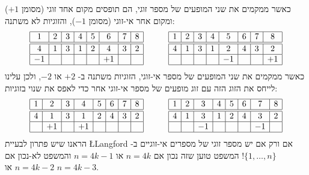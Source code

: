 כאשר ממקמים את שני המופעים של מספר זוגי, הם תופסים מקום אחד זוגי (מסומן 
$+1$)
ומקום אחר אי-זוגי (מסומן 
$-1$),
והזוגיות לא משתנה:
\[
\begin{array}{|c|c|c|c|c|c|c|c|}
\hline
1&2&3&4&5&6&7&8\\
\hline\hline
4&1&3&1&2&4&3&2\\\hline
-1&&&&&+1&&\\\hline
\end{array}
\hspace{3em}
\begin{array}{|c|c|c|c|c|c|c|c|}
\hline
1&2&3&4&5&6&7&8\\
\hline\hline
4&1&3&1&2&4&3&2\\\hline
&&&&-1&&&+1\\\hline
\end{array}
\]
כאשר ממקמים את שני המופעים של מספר אי-זוגי, הזוגיות משתנה ב-%
$+2$
או 
$-2$,
ולכן עלינו לייחס את הזוג הזה עם זוג מופעים של מספר אי-זוגי אחר כדי לאפס את שנוי בזוגיות:
\[
\begin{array}{|c|c|c|c|c|c|c|c|}
\hline
1&2&3&4&5&6&7&8\\
\hline\hline
4&1&3&1&2&4&3&2\\\hline
&+1&&+1&&&&\\\hline
\end{array}
\hspace{3em}
\begin{array}{|c|c|c|c|c|c|c|c|}
\hline
1&2&3&4&5&6&7&8\\
\hline\hline
4&1&3&1&2&4&3&2\\\hline
&&-1&&&&-1&\\\hline
\end{array}
\]
הראנו שיש פתרון לבעיית
\L{Langford}
אם ורק אם יש מספר זוגי של מספרים אי-זוגיים ב-%
$\{1,\ldots,n\}$!
המשפט טוען שזה נכון אם 
$n=4k$
או
$n=4k\!-\!1$
והמשפט לא-נכון אם
$n=4k\!-\!2$
או
$n=4k\!-\!3$.


